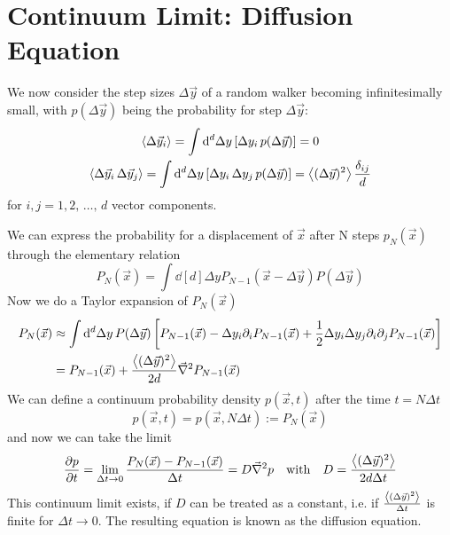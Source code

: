 \documentclass{/home/ben/Templates/notebook}
\begin{document}
	\section{Continuum Limit: Diffusion Equation}
	
	We now consider the step sizes $\Delta \vec{y}$ of a random walker becoming infinitesimally small, with $p(\Delta \vec{y})$ being the probability for step $\Delta \vec{y}$:
	\begin{gather}
		\expval{\Delta \vec{y}_i} = \int{\dd[d]{\Delta y} \left[ \Delta y_i \, p(\Delta \vec{y}) \right]} = 0 \\
		\expval{\Delta \vec{y}_i \, \Delta \vec{y}_j} = \int{\dd[d]{\Delta y} \left[ \Delta y_i \, \Delta y_j \, p(\Delta \vec{y}) \right]} = \expval{(\Delta \vec{y})^2} \frac{\delta_{ij}}{d}
	\end{gather}
	for $i, j = 1, 2, \, \dots, \, d$ vector components.
	
	We can express the probability for a displacement of $\vec{x}$ after N steps $p_N(\vec{x})$ through the elementary relation
	\begin{equation}
	P_N(\vec{x}) = \int{\dd[d]{\Delta y} P_{N-1}(\vec{x} - \Delta \vec{y}) P(\Delta \vec{y})}
	\end{equation}
	Now we do a Taylor expansion of $P_N(\vec{x})$
	\begin{align*}
		P_N(\vec{x}) &\approx \int{\dd[d]{\Delta y} P(\Delta \vec{y}) \left[ 
			P_{N-1}(\vec{x}) - \Delta y_i \partial_i P_{N-1}(\vec{x}) + \frac{1}{2}  \Delta y_i \Delta y_j \partial_i \partial_j P_{N-1}(\vec{x}) \right]} \\
		&= P_{N-1}(\vec{x}) + \frac{\expval{(\Delta \vec{y})^2}}{2 d} \vec{\nabla}^2 P_{N-1}(\vec{x})	
	\end{align*}
	We can define a continuum probability density $p(\vec{x},t)$ after the time $t = N \Delta t$
	\begin{equation}
	p(\vec{x},t) = p(\vec{x}, N \Delta t) := P_N(\vec{x})
	\end{equation}
	and now we can take the limit
	\begin{equation}
	\pdv{p}{t} = \lim_{\Delta t \to 0} \frac{P_N(\vec{x}) - P_{N-1}(\vec{x})}{\Delta t} = D \vec{\nabla}^2 p \quad \mathrm{with} \quad D = \frac{\expval{(\Delta \vec{y})^2}}{2 d \Delta t}
	\end{equation}
	This continuum limit exists, if $D$ can be treated as a constant, i.e. if $\frac{\expval{(\Delta \vec{y})^2}}{\Delta t}$ is finite for $\Delta t \to 0$. The resulting equation is known as the diffusion equation.
	
\end{document}
